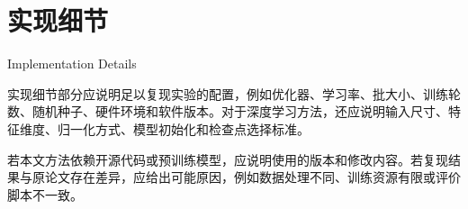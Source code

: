\section{实现细节}{Implementation Details}

实现细节部分应说明足以复现实验的配置，例如优化器、学习率、批大小、训练轮数、随机种子、硬件环境和软件版本。对于深度学习方法，还应说明输入尺寸、特征维度、归一化方式、模型初始化和检查点选择标准。

若本文方法依赖开源代码或预训练模型，应说明使用的版本和修改内容。若复现结果与原论文存在差异，应给出可能原因，例如数据处理不同、训练资源有限或评价脚本不一致。
